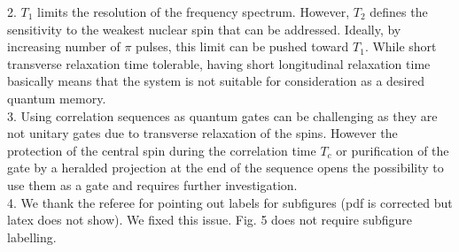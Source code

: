 \documentclass[12pt]{amsart}
\begin{document}
	2. $T_1$ limits the resolution of the frequency spectrum. However, $T_2$ defines the sensitivity to the weakest nuclear spin that can be addressed. Ideally, by increasing number of $\pi$ pulses, this limit can be pushed toward $T_1$. While short transverse relaxation time tolerable, having short longitudinal relaxation time basically means that the system is not suitable for consideration as a desired quantum memory. \\
	
	3. Using correlation sequences as quantum gates can be challenging as they are not unitary gates due to transverse relaxation of the spins. However the protection of the central spin during the correlation time $T_c$ or purification of the gate by a heralded projection at the end of the sequence opens the possibility to use them as a gate and requires further investigation.\\
	
	4. We thank the referee for pointing out labels for subfigures (pdf is corrected but latex does not show). We fixed this issue. Fig. 5 does not require subfigure labelling.
\end{document}
